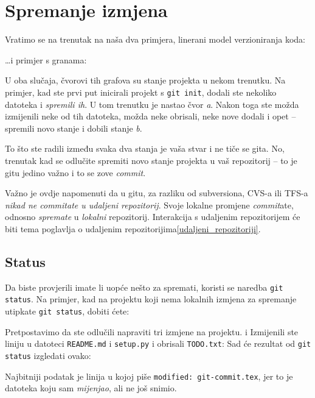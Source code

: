 \chapter*{Spremanje izmjena}

Vratimo se na trenutak na naša dva primjera, linerani model verzioniranja koda:



\dots{}i primjer s granama:



U oba slučaja, čvorovi tih grafova su stanje projekta u nekom trenutku.
Na primjer, kad ste prvi put inicirali projekt s \verb+git init+, dodali ste nekoliko datoteka i \emph{spremili ih}. 
U tom trenutku je nastao čvor \emph a.
Nakon toga ste možda izmijenili neke od tih datoteka, možda neke obrisali, neke nove dodali i opet -- spremili novo stanje i dobili stanje \emph b.

To što ste radili između svaka dva stanja je vaša stvar i ne tiče se gita.
No, trenutak kad se odlučite spremiti novo stanje projekta u vaš repozitorij -- to je gitu jedino važno i to se zove \emph{commit}.

Važno je ovdje napomenuti da u gitu, za razliku od subversiona, CVS-a ili TFS-a \emph{nikad ne commitate u udaljeni repozitorij}. 
Svoje lokalne promjene \emph{commit}ate, odnosno \emph{spremate} u \emph{lokalni} repozitorij.
Interakcija s udaljenim repozitorijem će biti tema poglavlja o udaljenim repozitorijima\ref{udaljeni_repozitoriji}.

\section*{Status}

Da biste provjerili imate li uopće nešto za spremati, koristi se naredba \verb+git status+.
Na primjer, kad na projektu koji nema lokalnih izmjena za spremanje utipkate \verb+git status+, dobiti ćete:



Pretpostavimo da ste odlučili napraviti tri izmjene na projektu. i
Izmijenili ste liniju u datoteci \verb+README.md+ i \verb+setup.py+ i obrisali \verb+TODO.txt+:
Sad će rezultat od \verb+git status+ izgledati ovako:



Najbitniji podatak je linija u kojoj piše \verb+modified: git-commit.tex+, jer to je datoteka koju sam \emph{mijenjao}, ali ne još snimio.

